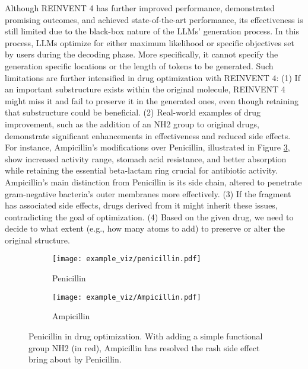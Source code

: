 Although REINVENT 4 has further improved performance, demonstrated promising outcomes, and achieved state-of-the-art performance, its effectiveness is still limited due to the black-box nature of the LLMs' generation process. In this process, LLMs optimize for either maximum likelihood or specific objectives set by users during the decoding phase. More specifically, it cannot specify the generation specific locations or the length of tokens to be generated.
Such limitations are further intensified in drug optimization with REINVENT 4:
(1) If an important substructure exists within the original molecule, REINVENT 4 might miss it and fail to preserve it in the generated ones, even though retaining that substructure could be beneficial.
(2) Real-world examples of drug improvement, such as the addition of an NH2 group to original drugs, demonstrate significant enhancements in effectiveness and reduced side effects. For instance, Ampicillin's modifications over Penicillin, illustrated in Figure \ref{fig:penicillin_example}, show increased activity range, stomach acid resistance, and better absorption while retaining the essential beta-lactam ring crucial for antibiotic activity. Ampicillin's main distinction from Penicillin is its side chain, altered to penetrate gram-negative bacteria's outer membranes more effectively.
(3) If the fragment has associated side effects, drugs derived from it might inherit these issues, contradicting the goal of optimization.
(4) Based on the given drug, we need to decide to what extent (e.g., how many atoms to add) to preserve or alter the original structure.
\vspace{-0.5cm}
\begin{figure}[ht]
    \centering
    \begin{subfigure}{0.45\textwidth}
    \centering
    \texttt{[image: example\_viz/penicillin.pdf]}
    \caption{Penicillin}\label{fig:results:vertebral}
\end{subfigure}
\begin{subfigure}{0.45\textwidth}
    \centering
    \texttt{[image: example\_viz/Ampicillin.pdf]}
    \caption{Ampicillin}\label{fig:results:hiv}
\end{subfigure}
    \caption{
    Penicillin in drug optimization. With adding a simple functional group NH2 (in \textcolor{myred}{red}), Ampicillin has resolved the rash side effect bring about by Penicillin.
    }
    \label{fig:penicillin_example}
    \vspace{-0.1cm}
\end{figure}
\vspace{-0.5cm}

